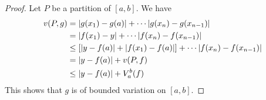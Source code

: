 \documentclass[thmcnt=section, color=blue, 12pt]{my-elegantbook}
\begin{document}
\begin{proof}
	Let $P$ be a partition of $[a, b]$.
	We have
	\begin{align}
		v(P, g) & = \left\lvert g(x_1) - g(a) \right\rvert + \cdots \left\lvert g(x_n) - g(x_{n-1}) \right\rvert                                     \nonumber \\
		        & = \left\lvert f(x_1) - y \right\rvert + \cdots \left\lvert f(x_n) - f(x_{n-1}) \right\rvert                                       \nonumber  \\
		        & \leq \left[ \left\lvert y -  f(a) \right\rvert + \left\lvert f(x_1) - f(a) \right\rvert \right] + \cdots \left\lvert f(x_n) - f(x_{n-1}) \right\rvert \nonumber \\
		        & = \left\lvert y - f(a) \right\rvert + v(P, f)                                                                  \nonumber  \\
		        & \leq \left\lvert y - f(a) \right\rvert + V_a^b(f)
		\label{eq:12}
	\end{align}
	This shows that $g$ is of bounded variation on $[a, b]$.


\end{proof}
\end{document}
